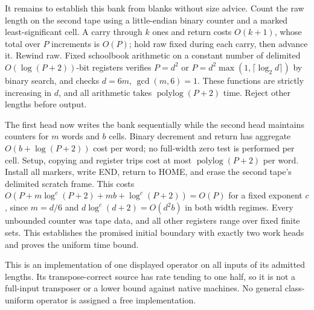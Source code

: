 \begin{informalproof}
It remains to establish this bank from blanks without size advice. Count
the raw length on the second tape using a little-endian binary counter
and a marked least-significant cell. A carry through $k$ ones and return
costs $O(k+1)$, whose total over $P$ increments is $O(P)$; hold raw fixed
during each carry, then advance it. Rewind raw. Fixed schoolbook arithmetic
on a constant number of delimited $O(\log(P+2))$-bit registers verifies
$P=d^2$ or $P=d^2\max(1,\lceil\log_2d\rceil)$ by binary search, and
checks $d=6m$, $\gcd(m,6)=1$. These functions are strictly increasing in
$d$, and all arithmetic takes $\operatorname{polylog}(P+2)$ time.
Reject other lengths before output.

The first head now writes the bank sequentially while the second head
maintains counters for $m$ words and $b$ cells. Binary decrement and return
has aggregate $O(b+\log(P+2))$ cost per word; no full-width zero test is
performed per cell. Setup, copying and register trips cost at most
$\operatorname{polylog}(P+2)$ per word. Install all markers, write END,
return to HOME, and erase the second tape's delimited scratch frame.
This costs
$O(P+m\log^c(P+2)+mb+\log^c(P+2))=O(P)$ for a fixed exponent $c$,
since $m=d/6$ and $d\log^c(d+2)=O(d^2b)$ in both width regimes.
Every unbounded counter was tape data, and all other registers range over
fixed finite sets. This establishes the promised initial boundary with
exactly two work heads and proves the uniform time bound.
\end{informalproof}

This is an implementation of one displayed operator on all inputs of its
admitted lengths. Its transpose-correct source has rate tending to one
half, so it is not a full-input transposer or a lower bound against native
machines. No general class-uniform operator is assigned a free implementation.
